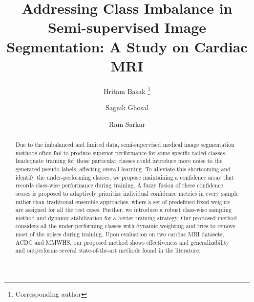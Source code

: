 \documentclass[runningheads]{llncs}
\begin{document}
\title{Addressing Class Imbalance in Semi-supervised Image Segmentation: A Study on Cardiac MRI}


\author{Hritam Basak \thanks{Corresponding author} \and
Sagnik Ghosal \and
Ram Sarkar}


\maketitle              \begin{abstract}
Due to the imbalanced and limited data, semi-supervised medical image segmentation methods often fail to produce superior performance for some specific tailed classes. Inadequate training for those particular classes could introduce more noise to the generated pseudo labels, affecting overall learning. To alleviate this shortcoming and identify the under-performing classes, we propose maintaining a confidence array that records class-wise performance during training. A fuzzy fusion of these confidence scores is proposed to adaptively prioritize individual confidence metrics in every sample rather than traditional ensemble approaches, where a set of predefined fixed weights are assigned for all the test cases. Further, we introduce a robust class-wise sampling method and dynamic stabilization for a better training strategy. Our proposed method considers all the under-performing classes with dynamic weighting and tries to remove most of the noises during training. Upon evaluation on two cardiac MRI datasets, ACDC and MMWHS, our proposed method shows effectiveness and generalizability and outperforms several state-of-the-art methods found in the literature.  

\end{abstract}
\end{document}

